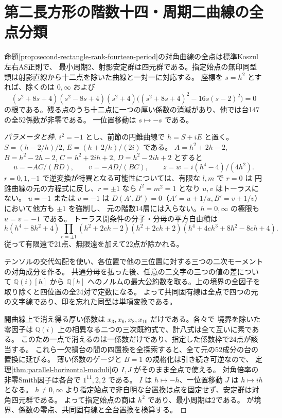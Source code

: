 \section{第二長方形の階数十四・周期二曲線の全点分類}
\label{sec:rank-fourteen-conic-complete}
\begin{theorem}\label{thm:rank-fourteen-conic-complete}
命題\ref{prop:second-rectangle-rank-fourteen-period}の対角曲線の全点は標準Koszul左右AS正則で、
最小周期2、射影安定群は四元群である。指定始点の無印同型類は射影直線から十二点を除いた曲線と一対一に対応する。
座標を $s=h^2$ とすれば、除くのは $0,\infty$ および
\[
 (s^2+8s+4)(s^2-8s+4)(s^2+4)
 \big((s^2+8s+4)^2-16s(s-2)^2\big)=0
\]
の根である。残る点のうち十二点に一つの厚い係数の消滅があり、他では台147の全52係数が非零である。
一位置移動は $s\mapsto-s$ である。
\end{theorem}

\begin{proof}[パラメータと枠]
$i^2=-1$ とし、前節の円錐曲線で $h=S+iE$ と置く。
$S=(h-2/h)/2$, $E=(h+2/h)/(2i)$ である。
$A=h^2+2h-2$, $B=h^2-2h-2$, $C=h^2+2ih+2$, $D=h^2-2ih+2$ とすると
\[
 u=-AC/(BD),\qquad v=-AD/(BC),\qquad z=w=i(h^4-4)/(4h^2).
\]
$r=0,1,-1$ で逆変換が特異となる可能性については、有限な $l,m$ で $r=0$ は
円錐曲線の元の方程式に反し、$r=\pm1$ なら $l^2=m^2=1$ となり $u,v$ はトーラスにない。
$u=-1$ または $v=-1$ は $D(A',B')=0$（$A'=u+1/u,B'=v+1/v$）において他方も $\pm1$ を強制し、
元の階数14層には入らない。$h=0,\infty$ の極限も $u=v=-1$ である。
トーラス開条件の分子・分母の平方自由積は
\[
 h(h^4+8h^2+4)\prod_{e=\pm1}(h^2+2eh-2)(h^2+2eh+2)(h^4+4eh^3+8h^2-8eh+4).
\]
従って有限遠で21点、無限遠を加えて22点が除かれる。

テンソルの交代勾配を使い、各位置で他の三位置に対する三つの二次モーメントの対角成分を作る。
共通分母を払った後、任意の二文字の三つの値の差について $\mathbb Q(i)[h]$ から
$\mathbb Q[h]$ へのノルムの最大公約数を取る。上の境界の全因子を取り除くと四位置の全24対で定数になる。
よって共同固有線は全点で四つの元の文字線であり、印を忘れた同型は単項変換である。

開曲線上で消え得る厚い係数は $x_3,x_6,x_8,x_{10}$ だけである。各々で
境界を除いた零因子は $\mathbb Q(i)$ 上の相異なる二つの三次既約式で、計八式は全て互いに素である。
このため一点で消えるのは一係数だけであり、指定した係数枠で24点が該当する。
これら一欠損台の間の四置換を全探索すると、全て元の52成分の台の置換に延びる。
薄い係数のゲージと $B=1$ の規格化は引き続き可逆なので、
定理\ref{thm:parallel-horizontal-moduli}の $I,J$ がそのまま全点で使える。
対角倍率の非零Smith因子は各台で $1^{11},2,2$ である。
$I$ は $h\mapsto-h$、一位置移動 $J$ は $h\mapsto ih$ となる。
$h\ne0,\infty$ より指定始点で非自明な台置換は点を固定せず、安定群は対角四元群である。
よって指定始点の商は $h^2$ であり、最小周期は2である。
 が境界、係数の零点、共同固有線と全台置換を検算する。
\end{proof}

